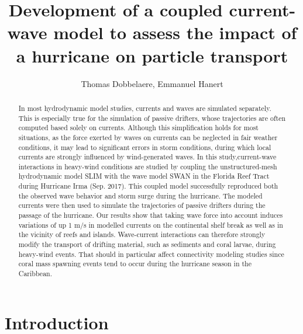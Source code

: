 \documentclass[11pt,a4paper]{article}
\title{Development of a coupled current-wave model to assess the impact of a hurricane on particle transport}
\author{Thomas Dobbelaere, Emmanuel Hanert}
\begin{document}
\maketitle
\begin{abstract}
In most hydrodynamic model studies, currents and waves are simulated separately. This is especially true for the simulation of passive drifters, whose trajectories are often computed based solely on currents. Although this simplification holds for most situations, as the force exerted by waves on currents can be neglected in fair weather conditions, it may lead to significant errors in storm conditions, during which local currents are strongly influenced by wind-generated waves. In this study,current-wave interactions in heavy-wind conditions  are studied by coupling the unstructured-mesh hydrodynamic model SLIM with the wave model SWAN in the Florida Reef Tract during Hurricane Irma (Sep. 2017). This coupled model successfully reproduced both the observed wave behavior and storm surge during the hurricane. The modeled currents were then used to simulate the trajectories of passive drifters during the passage of the hurricane. Our results show that taking wave force into account induces  variations of up 1 m/s in modelled currents on the continental shelf break as well as in the vicinity of  reefs and islands. Wave-current interactions can therefore strongly modify  the transport of drifting material, such as sediments and coral larvae, during heavy-wind events. That should in particular affect connectivity modeling studies since coral mass spawning events tend to occur during the hurricane season in the Caribbean.

\end{abstract}

\section{Introduction}
\end{document}
